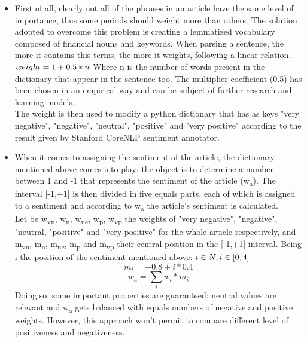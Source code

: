 \begin{itemize}
\item
First of all, clearly not all of the phrases in an article have the same level of importance, thus some periods should weight more than others. The solution adopted to overcome this problem is creating a lemmatized vocabulary composed of financial nouns and keywords. When parsing a sentence, the more it contains this terms, the more it weights, following a linear relation. \\
\begin{math}
weight = 1 + 0.5*n \\
\end{math}
Where n is the number of words present in the dictionary that appear in the sentence too.
The multiplier coefficient (0.5) has been chosen in an empirical way and can be subject of further research and learning models. \\
The weight is then used to modify a python dictionary that has as keys "very negative", "negative", "neutral", "positive" and "very positive" according to the result given by Stanford CoreNLP sentiment annotator.
\item 
When it comes to assigning the sentiment of the article, the dictionary mentioned above comes into play: the object is to determine a number between 1 and -1 that represents the sentiment of the article (w\textsubscript{a}). The interval [-1,+1] is then divided in five equals parts, each of which is assigned to a sentiment and according to w\textsubscript{a} the article's sentiment is calculated.\\
Let be w\textsubscript{vn}, w\textsubscript{n}, w\textsubscript{ne}, w\textsubscript{p}, w\textsubscript{vp} the weights of "very negative", "negative", "neutral, "positive" and "very positive" for the whole article respectively, and m\textsubscript{vn}, m\textsubscript{n}, m\textsubscript{ne}, m\textsubscript{p} and m\textsubscript{vp} their central position in the [-1,+1] interval. Being i the position of the sentiment mentioned above:\newline \newline
\begin{math}
i \in N, i \in [0,4] \\
\end{math}
\begin{equation}
m_i= -0.8+i*0.4
\end{equation}
\begin{equation}
w_a = \sum\limits_{i} w_i * m_i
\end{equation}
Doing so, some important properties are guaranteed: neutral values are relevant and w\textsubscript{a} gets balanced with equals numbers of negative and positive weights. However, this approach won't permit to compare different level of positiveness and negativeness. 
\end{itemize}
